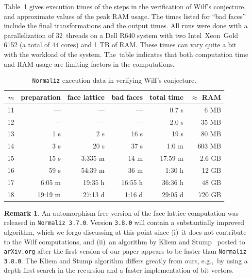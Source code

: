 \documentclass[12pt]{amsart}
\theoremstyle{definition}
\newtheorem{remark}[thm]{Remark}
\numberwithin{equation}{section}
\renewcommand\>{\rangle}
\newcommand\<{\langle}
\newcommand\0{\mathbf{0}}
\begin{document}
Table~\ref{tb:nmz_runtimes} gives execution times of the steps in the verification of Wilf's conjecture, and approximate values of the peak RAM usage.  The times listed for ``bad faces'' include the final transformations and the output times.  All runs were done with a parallelization of $32$~threads on a Dell R640 system with two Intel\texttrademark\ Xeon\texttrademark\ Gold 6152 (a total of $44$ cores) and 1 TB of RAM.  These times can vary quite a bit with the workload of the system. The~table indicates that both computation time and RAM usage are limiting factors in the computations.
\begin{table}
	\begin{tabular}{r|r|r|r|r|r|}
		$m$ & preparation& face lattice & bad faces & total time & $\approx$ RAM \\
		\hline
		\hline	
		11& --- & --- & --- & 0.7 s & 6 MB \\
		\hline
		12& --- & --- & --- & 2.0 s& 35 MB\\
		\hline
		13& 1 s& 2 s & 16 s& 19 s &  80 MB\\
		\hline
		14& 3 s & 20 s & 37 s & 1:0 m&  603 MB\\
		\hline
		15& 15 s & 3:335 m& 14 m& 17:59 m&  2.6 GB \\
		\hline
		16& 59 s& 54:39 m & 36 m & 1:30 h&  12 GB\\
		\hline
		17& 6:05 m& 19:35 h & 16:55 h& 36:36 h&  48 GB\\
		\hline
		18& 19:19 m& 27:13 d & 1:16 d    & 29:05 d &  720 GB\\
		\hline
	\end{tabular}
	\vspace*{1.5ex}
	\caption{\texttt{Normaliz} execution data in verifying Wilf's conjecture.}
	\label{tb:nmz_runtimes}
\end{table}

\begin{remark}\label{r:general_version}
An automorphism free version of the face lattice computation was released in \verb|Normaliz 3.7.0|.  Version \verb|3.8.0| will contain a substantially improved algorithm, which we forgo discussing at this point since (i)~it does not contribute to the Wilf computations, and (ii)~an algorithm by Kliem and Stump~\cite{K_and_S} posted to \verb|arXiv.org| after the first version of our paper appears to be faster than \verb|Normaliz 3.8.0|.  The Kliem and Stump algorithm differs greatly from ours, e.g.,\ by using a depth first search in the recursion and a faster implementation of bit vectors.  

\end{remark}
\end{document}
